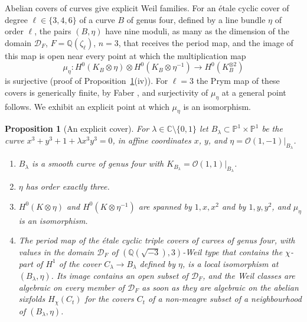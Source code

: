 \documentclass[11pt,reqno]{amsart}
\numberwithin{equation}{section}
\theoremstyle{plain}
\newtheorem{proposition}[theorem]{Proposition}
\theoremstyle{definition}
\newcommand{\QQ}{\mathbb{Q}}
\newcommand{\CC}{\mathbb{C}}
\newcommand{\PP}{\mathbb{P}}
\newcommand{\cD}{\mathcal{D}}
\begin{document}
Abelian covers of curves give explicit Weil families. For an \'etale cyclic cover of degree $\ell\in\{3,4,6\}$ of a curve $B$ of genus four, defined by a line bundle $\eta$ of order $\ell$, the pairs $(B,\eta)$ have nine moduli, as many as the dimension of the domain $\cD_{F}$, $F=\QQ(\zeta_{\ell})$, $n=3$, that receives the period map, and the image of this map is open near every point at which the multiplication map
\begin{equation}\label{eq:multmap}
\mu_{\eta}\colon H^{0}(K_{B}\otimes\eta)\otimes H^{0}(K_{B}\otimes\eta^{-1})\longrightarrow H^{0}(K_{B}^{\otimes2})
\end{equation}
is surjective (proof of Proposition~\ref{prop:genusfour}(iv)). For $\ell=3$ the Prym map of these covers is generically finite, by Faber \cite{Fab88}, and surjectivity of $\mu_{\eta}$ at a general point follows. We exhibit an explicit point at which $\mu_{\eta}$ is an isomorphism.

\begin{proposition}[An explicit cover]\label{prop:genusfour}
For $\lambda\in\CC\setminus\{0,1\}$ let $B_{\lambda}\subset\PP^{1}\times\PP^{1}$ be the curve $x^{3}+y^{3}+1+\lambda x^{3}y^{3}=0$, in affine coordinates $x$, $y$, and $\eta=\mathcal{O}(1,-1)|_{B_{\lambda}}$.
\begin{enumerate}[label=\textup{(\roman*)},leftmargin=2.4em,itemsep=2pt]
\item $B_{\lambda}$ is a smooth curve of genus four with $K_{B_{\lambda}}=\mathcal{O}(1,1)|_{B_{\lambda}}$.
\item $\eta$ has order exactly three.
\item $H^{0}(K\otimes\eta)$ and $H^{0}(K\otimes\eta^{-1})$ are spanned by $1,x,x^{2}$ and by $1,y,y^{2}$, and $\mu_{\eta}$ is an isomorphism.
\item The period map of the \'etale cyclic triple covers of curves of genus four, with values in the domain $\cD_{F}$ of $(\QQ(\sqrt{-3}),3)$-Weil type that contains the $\chi$-part of $H^{1}$ of the cover $C_{\lambda}\to B_{\lambda}$ defined by $\eta$, is a local isomorphism at $(B_{\lambda},\eta)$. Its image contains an open subset of $\cD_{F}$, and the Weil classes are algebraic on every member of $\cD_{F}$ as soon as they are algebraic on the abelian sixfolds $H_{\chi}(C_{t})$ for the covers $C_{t}$ of a non-meagre subset of a neighbourhood of $(B_{\lambda},\eta)$.
\end{enumerate}
\end{proposition}
\end{document}
